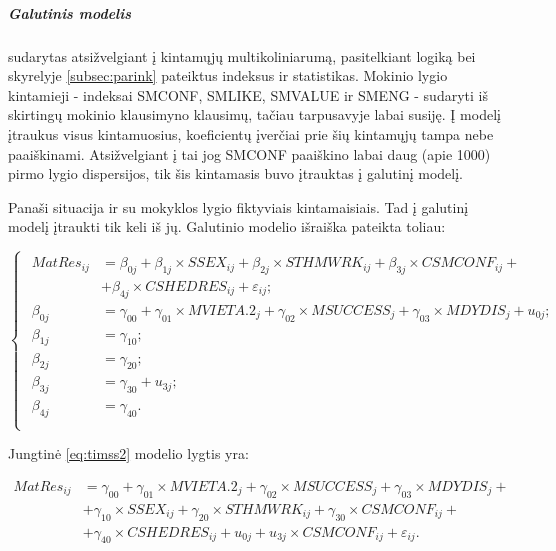 \documentclass[11pt,a4paper]{article}
\begin{document}
\subparagraph{Galutinis modelis} sudarytas atsižvelgiant į kintamųjų multikoliniarumą, pasitelkiant logiką bei skyrelyje \ref{subsec:parink} pateiktus indeksus ir statistikas. Mokinio lygio kintamieji - indeksai SMCONF, SMLIKE, SMVALUE ir SMENG - sudaryti iš skirtingų mokinio klausimyno klausimų, tačiau tarpusavyje labai susiję. Į modelį įtraukus visus kintamuosius, koeficientų įverčiai prie šių kintamųjų tampa nebe paaiškinami. Atsižvelgiant į tai jog SMCONF paaiškino labai daug (apie 1000) pirmo lygio dispersijos, tik šis kintamasis buvo įtrauktas į galutinį modelį.

\indent Panaši situacija ir su mokyklos lygio fiktyviais kintamaisiais. Tad į galutinį modelį įtraukti tik keli iš jų. Galutinio modelio išraiška pateikta toliau:
\begin{small}
\begin{equation} \label{eq:timss2}
\left\{
\begin{array}{l}
\begin{split}
MatRes_{ij}&=\beta_{0j}+\beta_{1j}\times SSEX_{ij}+\beta_{2j} \times STHMWRK_{ij}+\beta_{3j}\times CSMCONF_{ij}+\\
&+\beta_{4j}\times CSHEDRES_{ij}+\varepsilon_{ij};\\
\beta_{0j}&=\gamma_{00}+\gamma_{01}\times MVIETA.2_j+\gamma_{02}\times MSUCCESS_j+\gamma_{03}\times MDYDIS_j+u_{0j};\\
\beta_{1j}& = \gamma_{10};\\
\beta_{2j}&=\gamma_{20};\\
\beta_{3j}&=\gamma_{30}+u_{3j};\\
\beta_{4j}&=\gamma_{40}.\\
\end{split}
\end{array} \right.
\end{equation}
\end{small}
Jungtinė \ref{eq:timss2} modelio lygtis yra:
\begin{small}
\begin{equation} \label{eq:timss3}
\begin{split}
MatRes_{ij}&=\gamma_{00}+\gamma_{01}\times MVIETA.2_j+\gamma_{02}\times MSUCCESS_j+\gamma_{03}\times MDYDIS_j+\\
&+ \gamma_{10}\times SSEX_{ij}+\gamma_{20} \times STHMWRK_{ij}+\gamma_{30}\times CSMCONF_{ij}+\\
&+ \gamma_{40}\times CSHEDRES_{ij}+u_{0j}+u_{3j}\times  CSMCONF_{ij} +\varepsilon_{ij}.
\end{split}
\end{equation}
\end{small}
\end{document}
